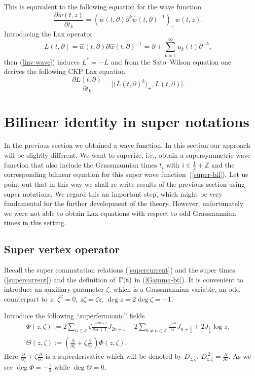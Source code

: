 \documentclass[pdftex]{sigma}
\numberwithin{equation}{section}
\newcommand{\Z}{\mathbb{Z}}
\begin{document}
This is equivalent to the following equation for the wave function
\[
\frac{\partial w(t,z)}{\partial t_k}= \left({\hat
w}(t,\partial)\partial^k{\hat w}(t,\partial)^{-1}\right)_+w(t,z).
\]
Introducing the Lax operator
\[
L(t,\partial)={\hat w}(t,\partial)\partial {\hat
w}(t,\partial)^{-1} =\partial+\sum_{k=1}^\infty
u_k(t)\partial^{-k},
\]
then (\ref{inv-wave}) induces $L^*=-L$ and
from the Sato--Wilson equation one derives the following CKP Lax equation:
\[
\frac{\partial L(t,\partial)}{\partial t_k} =\Big[ \big(
L(t,\partial)^k\big)_+,L(t,\partial)\Big].
\]

\section{Bilinear identity in super notations} %

In the previous section we obtained a wave function. In this section our approach will be slightly dif\/ferent.
We want to superize, i.e., obtain a supersymmetric wave function that also include the Grassmannian times
$t_i$ with $i\in\frac12+\mathbb{Z}$ and the corresponding bilinear equation for this super
 wave function~(\ref{super-bil}). Let us point out that in this way we shall re-write results of the previous
section using super notations. We regard this an important step, which might be very fundamental for the further development of the theory. However, unfortunately we were not able to obtain Lax equations with respect to odd Grassmannian times in this setting.


\subsection{Super vertex operator}
Recall the super  commutation relations (\ref{supercurrent}) and the super times
(\ref{supercurrent}) and the def\/inition of~$\Gamma({\bf t})$ in (\ref{Gamma-bt}).
It is convenient to introduce an auxiliary parameter $\zeta$, which
is a Grassmannian variable, an odd counterpart to $z$:
$\zeta^2=0$, $z\zeta=\zeta z$, $\deg z = 2\deg\zeta=-1$.


Introduce the following ``superfermionic'' f\/ields
\begin{gather*}
\Phi(z,\zeta)  :=  2\sum_{n\in\Z} \zeta
 \frac{z^{-2n-1}}{2n+1}J_{2n+1}-2\sum_{0\neq
n\in\Z}\frac{z^{-n}}{n}J_{n+\frac 12}  + 2 J_{\frac12}\log z ,
\\
\Theta(z,\zeta)  :=  \left(\frac{\partial}{\partial
\zeta}+\zeta\frac{\partial}{\partial z} \right)\Phi(z,\zeta) .
\end{gather*}
 Here $\frac{\partial}{\partial
\zeta}+\zeta\frac{\partial}{\partial z} $ is a superderivative
which will be denoted by $D_{z,\zeta}$,
$D_{z,\zeta}^{\ 2}=\frac{\partial}{\partial z}$. As we see $\deg
\Phi =-\frac 12$ while $\deg \Theta=0$.
\end{document}
